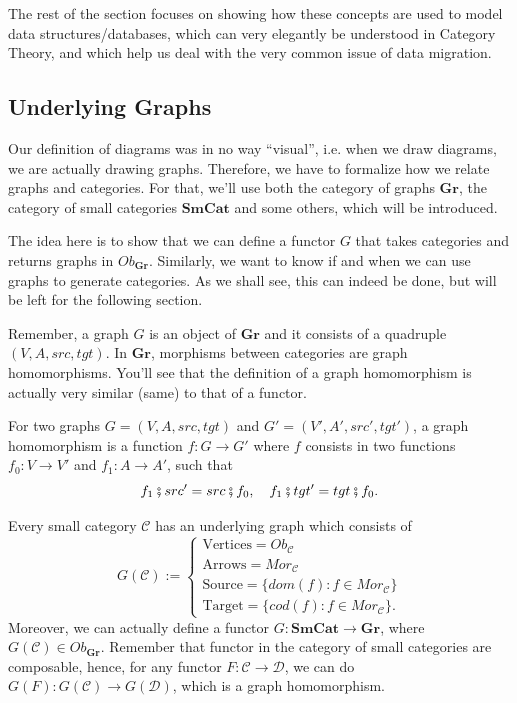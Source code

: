 The rest of the section focuses on showing how these concepts are used to
model data structures/databases, which can very
elegantly be understood in Category Theory, and which help us deal with the very
common issue of data migration.

\subsection{Underlying Graphs}

Our definition of diagrams was in no way ``visual'', i.e. when we draw
diagrams, we are actually drawing graphs. Therefore, we have to formalize how
we relate graphs and categories.
For that, we'll use both the
category of graphs $\mathbf{Gr}$, the category of small categories
$\mathbf{SmCat}$ and some others, which will be introduced.

The idea here is to show that we can define a functor
$G$ that takes categories and returns graphs in $Ob_\mathbf{Gr}$.
Similarly, we want to know if and when we can use graphs to generate categories.
As we shall see, this can indeed be done, but will be left for the following section.

Remember, a graph $G$ is an object of $\mathbf{Gr}$ and it
consists of a quadruple $(V, A, src, tgt)$. In $\mathbf{Gr}$, morphisms
between categories are graph homomorphisms. You'll see that the
definition of a graph homomorphism is actually very similar (same) to that of a functor.

\begin{definition}
  For two graphs $G=(V, A, src, tgt)$ and $G' = (V', A', src', tgt')$,
  a graph homomorphism is a function
  $f:G \to G'$ where $f$ consists in two functions $f_0:V\to V'$ and
  $f_1:A \to A'$, such that
  \begin{displaymath}
    f_1 \fatsemi src' = src \fatsemi f_0, \quad
    f_1 \fatsemi tgt' = tgt \fatsemi f_0.
  \end{displaymath}
\end{definition}

\begin{definition}
  Every small category $\mathcal C$ has an underlying graph which consists of
  \begin{displaymath}
  G(\mathcal C) := \begin{cases}
    \text{Vertices} = Ob_\mathcal C \\
    \text{Arrows} = Mor_\mathcal C \\
    \text{Source} = \{dom(f)  : f \in Mor_\mathcal C\} \\
    \text{Target} = \{cod(f)  : f \in Mor_\mathcal C\}.
    \end{cases}
  \end{displaymath}
  Moreover, we can actually define a functor $G : \mathbf{SmCat} \to \mathbf{Gr}$,
  where $G(\mathcal C) \in Ob_{\mathbf{Gr}}$. Remember that functor in the 
  category of small categories are composable, hence, for any 
  functor $F:\mathcal C \to \mathcal D$, we can do
  $G(F):G(\mathcal C) \to G(\mathcal D)$, which is a graph homomorphism.
\end{definition}

